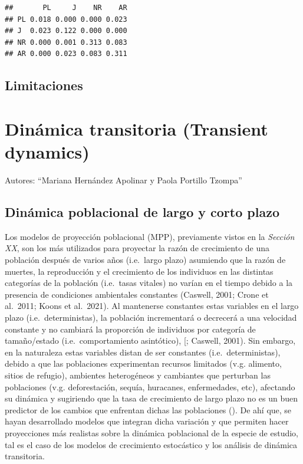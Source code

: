 \documentclass[
]{book}
\theoremstyle{definition}
\theoremstyle{definition}
\theoremstyle{definition}
\theoremstyle{definition}
\theoremstyle{remark}
\begin{document}
\begin{verbatim}
##       PL     J    NR    AR
## PL 0.018 0.000 0.000 0.023
## J  0.023 0.122 0.000 0.000
## NR 0.000 0.001 0.313 0.083
## AR 0.000 0.023 0.083 0.311
\end{verbatim}

\section{Limitaciones}\label{limitaciones}

\chapter{Dinámica transitoria (Transient dynamics)}\label{dinuxe1mica-transitoria-transient-dynamics}

Autores: ``Mariana Hernández Apolinar y Paola Portillo Tzompa''

\section{Dinámica poblacional de largo y corto plazo}\label{dinuxe1mica-poblacional-de-largo-y-corto-plazo}

Los modelos de proyección poblacional (MPP), previamente vistos en la \emph{Sección XX}, son los más utilizados para proyectar la razón de crecimiento de una población después de varios años (i.e.~largo plazo) asumiendo que la razón de muertes, la reproducción y el crecimiento de los individuos en las distintas categorías de la población (i.e.~tasas vitales) no varían en el tiempo debido a la presencia de condiciones ambientales constantes (Caswell, 2001; Crone et al.~2011; Koons et al.~2021). Al mantenerse constantes estas variables en el largo plazo (i.e.~deterministas), la población incrementará o decrecerá a una velocidad constante y no cambiará la proporción de individuos por categoría de tamaño/estado (i.e.~comportamiento asintótico), {[}\citet{bierzychudek1999looking}; Caswell, 2001). Sin embargo, en la naturaleza estas variables distan de ser constantes (i.e.~deterministas), debido a que las poblaciones experimentan recursos limitados (v.g. alimento, sitios de refugio), ambientes heterogéneos y cambiantes que perturban las poblaciones (v.g. deforestación, sequía, huracanes, enfermedades, etc), afectando su dinámica y sugiriendo que la tasa de crecimiento de largo plazo no es un buen predictor de los cambios que enfrentan dichas las poblaciones (\citet{bierzychudek1999looking}). De ahí que, se hayan desarrollado modelos que integran dicha variación y que permiten hacer proyecciones más realistas sobre la dinámica poblacional de la especie de estudio, tal es el caso de los modelos de crecimiento estocástico y los análisis de dinámica transitoria.
\end{document}
